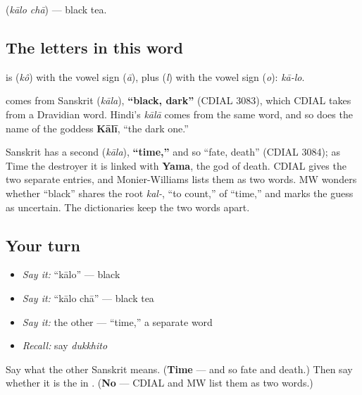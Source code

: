  (\emph{kālo chā}) — black tea.

\subsection*{The letters in this word}
\textbf{} is \textbf{} (\emph{kô}) with the vowel sign \textbf{} (\emph{ā}), plus \textbf{} (\emph{l}) with the vowel sign \textbf{} (\emph{o}): \emph{kā-lo}.

\begin{cousinweb}
\textbf{} comes from Sanskrit \textbf{} (\emph{kāla}), \textbf{\textquotedblleft{}black, dark\textquotedblright{}} (CDIAL 3083), which CDIAL takes from a Dravidian word. Hindi's \emph{kālā} comes from the same word, and so does the name of the goddess \textbf{Kālī}, \textquotedblleft{}the dark one.\textquotedblright{}

Sanskrit has a second \textbf{} (\emph{kāla}), \textbf{\textquotedblleft{}time,\textquotedblright{}} and so \textquotedblleft{}fate, death\textquotedblright{} (CDIAL 3084); as Time the destroyer it is linked with \textbf{Yama}, the god of death. CDIAL gives the two separate entries, and Monier-Williams lists them as two words. MW wonders whether \textquotedblleft{}black\textquotedblright{} shares the root \emph{kal-}, \textquotedblleft{}to count,\textquotedblright{} of \textquotedblleft{}time,\textquotedblright{} and marks the guess as uncertain. The dictionaries keep the two words apart.
\end{cousinweb}

\subsection*{Your turn}
\begin{itemize}
\raggedright
  \item \emph{Say it:} \textquotedblleft{}kālo\textquotedblright{} — black
  \item \emph{Say it:} \textquotedblleft{}kālo chā\textquotedblright{} — black tea
  \item \emph{Say it:} the other  — \textquotedblleft{}time,\textquotedblright{} a separate word
  \item \emph{Recall:} say \emph{dukkhito}
\end{itemize}

\begin{tcolorbox}[breakable,colback=teal!4,colframe=teal!35!black,title={Before you move on}]
Say what the other Sanskrit  means. (\textbf{Time} — and so fate and death.) Then say whether it is the  in . (\textbf{No} — CDIAL and MW list them as two words.)
\end{tcolorbox}
